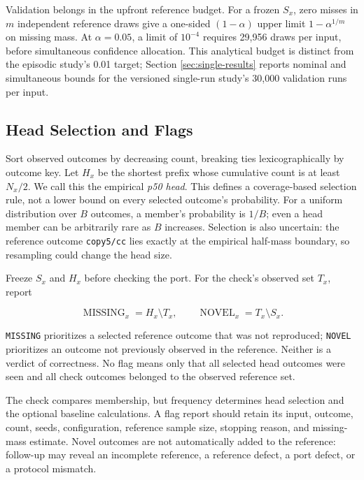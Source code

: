 \documentclass[10pt,letterpaper]{article}
\begin{document}
Validation belongs in the upfront reference budget. For a frozen \(S_x\), zero misses in
\(m\) independent reference draws give a one-sided \((1-\alpha)\) upper limit
\(1-\alpha^{1/m}\) on missing mass. At \(\alpha=0.05\), a limit of \(10^{-4}\) requires
29,956 draws per input, before simultaneous confidence allocation. This analytical budget
is distinct from the episodic study's 0.01 target; Section \ref{sec:single-results}
reports nominal and simultaneous bounds for the versioned single-run study's 30,000
validation runs per input.

\subsection{Head Selection and Flags}\label{sec:flags}

Sort observed outcomes by decreasing count, breaking ties lexicographically by outcome
key. Let \(H_x\) be the shortest prefix whose cumulative count is at least \(N_x/2\). We
call this the empirical \emph{p50 head}. This defines a coverage-based selection rule, not
a lower bound on every selected outcome's probability. For a uniform distribution over
\(B\) outcomes, a member's probability is \(1/B\); even a head member can be arbitrarily
rare as \(B\) increases. Selection is also uncertain: the reference outcome
\texttt{copy5/cc} lies exactly at the empirical half-mass boundary, so resampling could
change the head size.

Freeze \(S_x\) and \(H_x\) before checking the port. For the check's observed set \(T_x\),
report

\[
\operatorname{MISSING}_x=H_x\setminus T_x,\qquad
\operatorname{NOVEL}_x=T_x\setminus S_x.
\]

\texttt{MISSING} prioritizes a selected reference outcome that was not reproduced;
\texttt{NOVEL} prioritizes an outcome not previously observed in the reference. Neither is
a verdict of correctness. No flag means only that all selected head outcomes were seen and
all check outcomes belonged to the observed reference set.

The check compares membership, but frequency determines head selection and the optional
baseline calculations. A flag report should retain its input, outcome, count, seeds,
configuration, reference sample size, stopping reason, and missing-mass estimate. Novel
outcomes are not automatically added to the reference: follow-up may reveal an incomplete
reference, a reference defect, a port defect, or a protocol mismatch.
\end{document}
